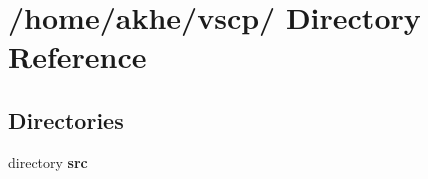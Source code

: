 \section{/home/akhe/vscp/ Directory Reference}
\label{dir_b8e143d26bb049ad2f5f72c15a11c536}
\subsection*{Directories}
\begin{CompactItemize}
\item 
directory {\bf src}
\end{CompactItemize}
